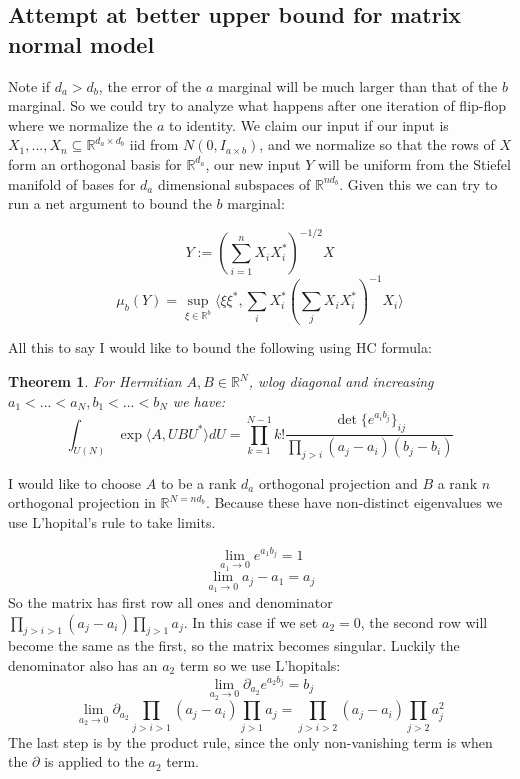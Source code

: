 \documentclass{article}
\newtheorem{theorem}{Theorem}
\newcommand{\R}{{\mathbb{R}}}
\begin{document}
\subsection{Attempt at better upper bound for matrix normal model}
Note if $d_{a} > d_{b}$, the error of the $a$ marginal will be much larger than that of the $b$ marginal. So we could try to analyze what happens after one iteration of flip-flop where we normalize the $a$ to identity. We claim our input if our input is $X_{1}, ..., X_{n} \subseteq \R^{d_{a} \times d_{b}}$ iid from $N(0,I_{a \times b})$, and we normalize so that the rows of $X$ form an orthogonal basis for $\R^{d_{a}}$, our new input $Y$ will be uniform from the Stiefel manifold of bases for $d_{a}$ dimensional subspaces of $\R^{nd_{b}}$. Given this we can try to run a net argument to bound the $b$ marginal:

\[ Y := \left( \sum_{i=1}^{n} X_{i} X_{i}^{*} \right)^{-1/2} X      \]
\[ \mu_{b}(Y) = \sup_{\xi \in \R^{b}} \langle \xi \xi^{*}, \sum_{i} X_{i}^{*} \left( \sum_{j} X_{i} X_{i}^{*} \right)^{-1} X_{i} \rangle       \]

All this to say I would like to bound the following using HC formula:

\begin{theorem} 
For Hermitian $A,B \in \R^{N}$, wlog diagonal and increasing $a_{1} < ... < a_{N}, b_{1} < ... < b_{N}$ we have:
\[  \int_{U(N)} \exp \langle A, U B U^{*} \rangle dU = \prod_{k=1}^{N-1} k!  \frac{\det\{e^{a_{i} b_{j}}\}_{ij}}{\prod_{j > i} (a_{j} - a_{i}) (b_{j} - b_{i})} \]
\end{theorem}

I would like to choose $A$ to be a rank $d_{a}$ orthogonal projection and $B$ a rank $n$ orthogonal projection in $\R^{N = nd_{b}}$. Because these have non-distinct eigenvalues we use L'hopital's rule to take limits. 

\[ \lim_{a_{1} \to 0} e^{a_{1} b_{j}} = 1     \]
\[ \lim_{a_{1} \to 0} a_{j} - a_{1} = a_{j}     \]
So the matrix has first row all ones and denominator $\prod_{j > i > 1} (a_{j} - a_{i}) \prod_{j > 1} a_{j}$. In this case if we set $a_{2} = 0$, the second row will become the same as the first, so the matrix becomes singular. Luckily the denominator also has an $a_{2}$ term so we use L'hopitals:
\[ \lim_{a_{2} \to 0} \partial_{a_{2}} e^{a_{2} b_{j}} = b_{j}     \]
\[ \lim_{a_{2} \to 0} \partial_{a_{2}} \prod_{j > i > 1} (a_{j} - a_{i}) \prod_{j > 1} a_{j} = \prod_{j > i > 2} (a_{j} - a_{i}) \prod_{j > 2} a_{j}^{2}    \]
The last step is by the product rule, since the only non-vanishing term is when the $\partial$ is applied to the $a_{2}$ term. 
\end{document}
